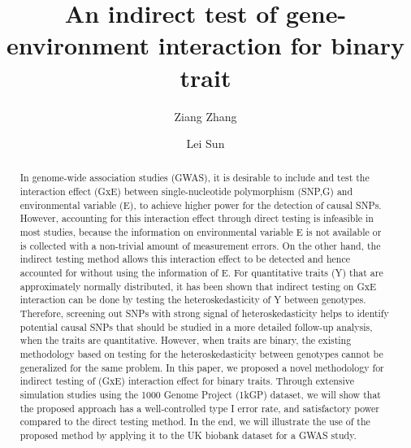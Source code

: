 \documentclass[12pt]{article}
\title{\textbf{An indirect test of gene-environment interaction for binary trait}}
\date{} 					%
\author[1]{Ziang Zhang}
\author[1, 2]{Lei Sun}
\affil[1]{Department of Statistical Science, University of Toronto, Ontario M5S 3G3, Canada}
\affil[2]{Division of Biostatistics, Dalla Lana School of Public Health, University of Toronto, Ontario M5T 3M7, Canada}
\begin{document}
\maketitle

\begin{abstract}
In genome-wide association studies (GWAS), it is desirable to include and test the interaction effect (GxE) between single-nucleotide polymorphism (SNP,G) and environmental variable (E), to achieve higher power for the detection of causal SNPs. However, accounting for this interaction effect through direct testing is infeasible in most studies, because the information on environmental variable E is not available or is collected with a non-trivial amount of measurement errors. On the other hand, the indirect testing method allows this interaction effect to be detected and hence accounted for without using the information of E. For quantitative traits (Y) that are approximately normally distributed, it has been shown that indirect testing on GxE interaction can be done by testing the heteroskedasticity of Y between genotypes.
Therefore, screening out SNPs with strong signal of heteroskedasticity helps to identify potential causal SNPs that should be studied in a more detailed follow-up analysis, when the traits are quantitative. However, when traits are binary, the existing methodology based on testing for the heteroskedasticity between genotypes cannot be generalized for the same problem. In this paper, we proposed a novel methodology for indirect testing of (GxE) interaction effect for binary traits. Through extensive simulation studies using the 1000 Genome Project (1kGP) dataset, we will show that the proposed approach has a well-controlled type I error rate, and satisfactory power compared to the direct testing method. In the end, we will illustrate the use of the proposed method by applying it to the UK biobank dataset for a GWAS study.
\end{abstract}

\doublespacing

\clearpage







\newpage

\end{document}

